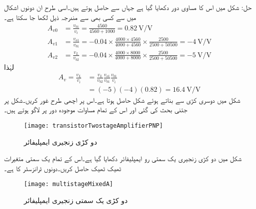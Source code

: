 حل: شکل  میں اس کا مساوی دور دکھایا گیا ہے جہاں سے  حاصل ہوتے ہیں۔اسی طرح ان دونوں اشکال میں سے کسی بھی سے مندرجہ ذیل لکھا جا سکتا ہے۔
\begin{align*}
A_{v0}&=\frac{v_{b1}}{v_i}=\frac{4560}{4560+1000}=\SI[per=frac,fraction=nice]{0.82}{\volt \per \volt}\\
A_{v1}&=\frac{v_{o1}}{v_{b1}}= -0.04 \times \frac{4000 \times 4560}{4000+4560} \times \frac{2500}{2500+50500}=\SI[per=frac,fraction=nice]{-4}{\volt \per \volt}\\
A_{v2}&=\frac{v_L}{v_{b2}}=-0.04 \times \frac{4000 \times 8000}{4000+8000} \times \frac{2500}{2500+50500}=\SI[per=frac,fraction=nice]{-5}{\volt \per \volt}
\end{align*}
لہٰذا
\begin{align*}
A_{v}=\frac{v_L}{v_i}&=\frac{v_L}{v_{b2}} \frac{v_{o1}}{v_{b1}} \frac{v_{b1}}{v_i}\\
&=\left(-5 \right) \left(-4 \right) \left(0.82 \right)=\SI[per=frac,fraction=nice]{16.4}{\volt \per \volt}
\end{align*}
شکل  میں دوسری کڑی  سے بناتے ہوئے شکل  حاصل ہوتا ہے۔اس پر اچھی طرح غور کریں۔شکل  پر جتنی بحث کی گئی اور اس کے تمام مساوات موجودہ دور پر لاگو ہوتے ہیں۔
\begin{figure}
\centering
\texttt{[image: transistorTwostageAmplifierPNP]}
\caption{دو کڑی زنجیری ایمپلیفائر}
\label{شکل_دو_کڑی_زنجیری_ایمپلیفائر_مثبت_منفی_مثبت}
\end{figure}
شکل  میں دو کڑی زنجیری یک سمتی رو ایمپلیفائر دکھایا گیا ہے۔اس کے تمام یک سمتی متغیرات ٹھیک ٹھیک  حاصل کریں۔دونوں ٹرانزسٹر کا  ہے۔
\begin{figure}
\centering
\texttt{[image: multistageMixedA]}
\caption{دو کڑی یک سمتی زنجیری ایمپلیفائر}
\label{شکل_دو_کڑی_زنجیری_یکسمتی_ایمپلیفائر_مثبت_منفی_مثبت}
\end{figure}


